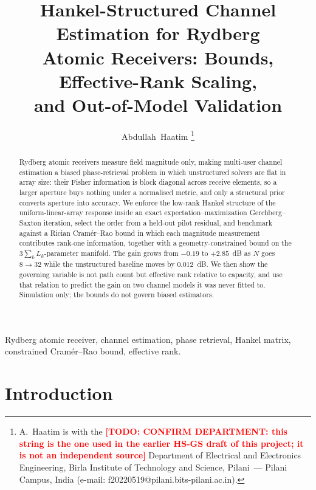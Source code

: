 \documentclass[journal]{IEEEtran}
\newcommand{\todo}[1]{\textcolor{red}{\textbf{[TODO: #1]}}}
\begin{document}
\title{Hankel-Structured Channel Estimation for Rydberg\\
Atomic Receivers: Bounds, Effective-Rank Scaling,\\
and Out-of-Model Validation}

\author{Abdullah~Haatim%
\thanks{A.~Haatim is with the \todo{CONFIRM DEPARTMENT: this string is the one
used in the earlier HS-GS draft of this project; it is not an independent
source} Department of Electrical and Electronics Engineering, Birla Institute
of Technology and Science, Pilani~--- Pilani Campus, India (e-mail:
f20220519@pilani.bits-pilani.ac.in).}}

\maketitle

\begin{abstract}
Rydberg atomic receivers measure field magnitude only, making multi-user
channel estimation a biased phase-retrieval problem in which unstructured
solvers are flat in array size: their Fisher information is block diagonal
across receive elements, so a larger aperture buys nothing under a normalised
metric, and only a structural prior converts aperture into accuracy. We
enforce the low-rank Hankel structure of the uniform-linear-array response
inside an exact expectation--maximization Gerchberg--Saxton iteration, select
the order from a held-out pilot residual, and benchmark against a Rician
Cram\'er--Rao bound in which each magnitude measurement contributes rank-one
information, together with a geometry-constrained bound on the
$3\sum_k L_k$-parameter manifold. The gain grows from $-0.19$ to $+2.85$~dB as
$N$ goes $8\to32$ while the unstructured baseline moves by $0.012$~dB. We then
show the governing variable is not path count but effective rank relative to
capacity, and use that relation to predict the gain on two channel models it
was never fitted to. Simulation only; the bounds do not govern biased
estimators.
\end{abstract}

\begin{IEEEkeywords}
Rydberg atomic receiver, channel estimation, phase retrieval, Hankel matrix,
constrained Cram\'er--Rao bound, effective rank.
\end{IEEEkeywords}

\section{Introduction}
\end{document}
